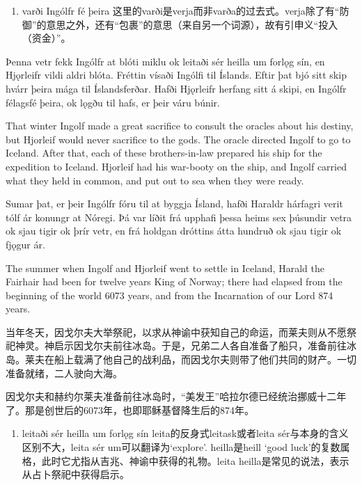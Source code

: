 \begin{grammar*}{}
    \begin{enumerate}[leftmargin=*]
        \item varði Ingólfr fé þeira
              这里的varði是verja而非varða的过去式。verja除了有“防御”的意思之外，还有“包裹”的意思（来自另一个词源），故有引申义“投入（资金）”。
    \end{enumerate}
\end{grammar*}


\begin{paracol}{2}
    Þenna vetr fekk Ingólfr at blóti miklu ok leitaði sér heilla um forlǫg sín, en Hjǫrleifr vildi aldri blóta. Fréttin vísaði Ingólfi til Íslands. Eftir þat bjó sitt skip hvárr þeira mága til Íslandsferðar. Hafði Hjǫrleifr herfang sitt á skipi, en Ingólfr félagsfé þeira, ok lǫgðu til hafs, er þeir váru búnir.

    \switchcolumn

    That winter Ingolf made a great sacrifice to consult the oracles about his destiny, but Hjorleif would never sacrifice to the gods. The oracle directed Ingolf to go to Iceland. After that, each of these brothers-in-law prepared his ship for the expedition to Iceland. Hjorleif had his war-booty on the ship, and Ingolf carried what they held in common, and put out to sea when they were ready.

    \switchcolumn*

    Sumar þat, er þeir Ingólfr fóru til at byggja Ísland, hafði Haraldr hárfagri verit tólf ár konungr at Nóregi. Þá var líðit frá upphafi þessa heims sex þúsundir vetra ok sjau tigir ok þrír vetr, en frá holdgan dróttins átta hundruð ok sjau tigir ok fjǫgur ár.

    \switchcolumn

    The summer when Ingolf and Hjorleif went to settle in Iceland, Harald the Fairhair had been for twelve years King of Norway; there had elapsed from the beginning of the world 6073 years, and from the Incarnation of our Lord 874 years.

\end{paracol}

\begin{translation*}{}
    当年冬天，因戈尔夫大举祭祀，以求从神谕中获知自己的命运，而莱夫则从不愿祭祀神灵。神启示因戈尔夫前往冰岛。于是，兄弟二人各自准备了船只，准备前往冰岛。莱夫在船上载满了他自己的战利品，而因戈尔夫则带了他们共同的财产。一切准备就绪，二人驶向大海。

    因戈尔夫和赫约尔莱夫准备前往冰岛时，“美发王”哈拉尔德已经统治挪威十二年了。那是创世后的6073年，也即耶稣基督降生后的874年。
\end{translation*}
\begin{grammar*}{}
    \begin{enumerate}[leftmargin=*]
        \item leitaði sér heilla um forlǫg sín
              leita的反身式leitask或者leita sér与本身的含义区别不大，leita sér um可以翻译为`explore'. heilla是heill `good luck'的复数属格，此时它尤指从吉兆、神谕中获得的礼物。leita heilla是常见的说法，表示从占卜祭祀中获得启示。
    \end{enumerate}
\end{grammar*}

